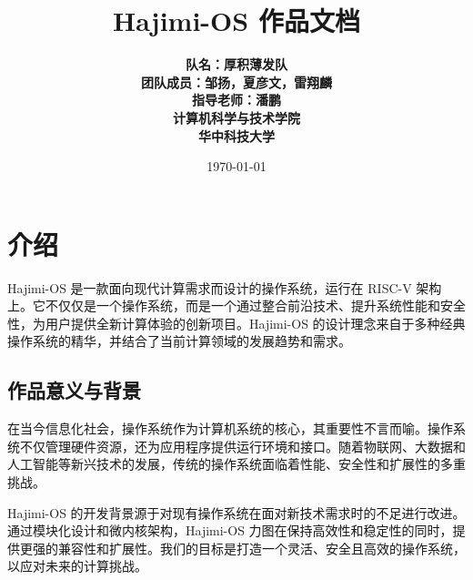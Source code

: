 \documentclass[UTF8]{article}
\newcommand{\smallertitlefont}[2]{{\fontsize{#1}{1.2\baselineskip}\selectfont\mdseries #2}}
\newcommand{\smallermaintitlefont}[2]{{\fontsize{#1}{1.2\baselineskip}\selectfont\bfseries #2}}
\begin{document}
\title{ \bfseries{\Huge Hajimi-OS 作品文档}}
\author{\smallermaintitlefont{15pt}{队名：厚积薄发队}  \\[10pt] \smallertitlefont{12pt}{\textbf{团队成员：邹扬，夏彦文，雷翔麟  }}
  \\[10pt] \smallertitlefont{12pt}{\textbf{指导老师：潘鹏  }}
  \\[320pt] \smallertitlefont{12pt}{\textbf{计算机科学与技术学院}}
  \\[10pt] \smallertitlefont{12pt}{\textbf{华中科技大学}}
}

\date{\today}
\maketitle

\newpage
\tableofcontents
\newpage


\section{介绍}
Hajimi-OS 是一款面向现代计算需求而设计的操作系统，运行在 RISC-V 架构上。它不仅仅是一个操作系统，而是一个通过整合前沿技术、提升系统性能和安全性，为用户提供全新计算体验的创新项目。Hajimi-OS 的设计理念来自于多种经典操作系统的精华，并结合了当前计算领域的发展趋势和需求。

\subsection{作品意义与背景}
在当今信息化社会，操作系统作为计算机系统的核心，其重要性不言而喻。操作系统不仅管理硬件资源，还为应用程序提供运行环境和接口。随着物联网、大数据和人工智能等新兴技术的发展，传统的操作系统面临着性能、安全性和扩展性的多重挑战。

Hajimi-OS 的开发背景源于对现有操作系统在面对新技术需求时的不足进行改进。通过模块化设计和微内核架构，Hajimi-OS 力图在保持高效性和稳定性的同时，提供更强的兼容性和扩展性。我们的目标是打造一个灵活、安全且高效的操作系统，以应对未来的计算挑战。
\end{document}
